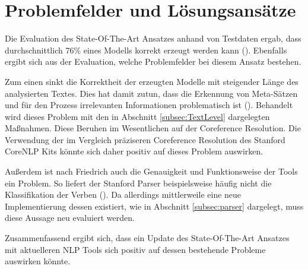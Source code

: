 \section{Problemfelder und Lösungsansätze}
Die Evaluation des State-Of-The-Art Ansatzes anhand von Testdaten ergab, dass durchschnittlich 76\% eines Modells korrekt erzeugt werden kann (\cite[vgl.][115]{FRIEDRICH1}). Ebenfalls ergibt sich aus der Evaluation, welche Problemfelder bei diesem Ansatz bestehen.\par Zum einen sinkt die Korrektheit der erzeugten Modelle mit steigender Länge des analysierten Textes. Dies hat damit zutun, dass die Erkennung von Meta-Sätzen und für den Prozess irrelevanten Informationen problematisch ist (\cite[vgl.][116]{FRIEDRICH1}). Behandelt wird dieses Problem mit den in Abschnitt \ref{subsec:TextLevel} dargelegten Maßnahmen. Diese Beruhen im Wesentlichen auf der Coreference Resolution. Die Verwendung der im Vergleich präziseren Coreference Resolution des Stanford CoreNLP Kits könnte sich daher positiv auf dieses Problem auswirken.\par
Außerdem ist nach Friedrich auch die Genauigkeit und Funktionsweise der Tools ein Problem. So liefert der Stanford Parser beispielsweise häufig nicht die Klassifikation der Verben (\cite[vgl.][117 ff.]{FRIEDRICH1}). Da allerdings mittlerweile eine neue Implementierung dessen existiert, wie in Abschnitt \ref{subsec:parser} dargelegt, muss diese Aussage neu evaluiert werden.\par
Zusammenfassend ergibt sich, dass ein Update des State-Of-The-Art Ansatzes mit aktuelleren \ac{NLP} Tools sich positiv auf dessen bestehende Probleme auswirken könnte.


